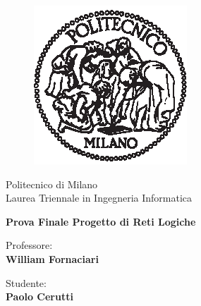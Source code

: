 \begin{titlepage}
\begin{figure}[!htb]
    \centering
    \includegraphics[keepaspectratio=true,scale=1.5]{images/Frontespizio/pol.eps}
\end{figure}

\begin{center}
    \huge{Politecnico di Milano}
    \vspace{10mm}
    \\ \Large{Laurea Triennale in Ingegneria Informatica}
\end{center}
\vspace{35mm}
\begin{center}
    {\LARGE{\bf Prova Finale Progetto di Reti Logiche }}
\end{center}
\vspace{70mm}

\begin{minipage}[t]{0.47\textwidth}
	{\large{Professore:}{\normalsize\vspace{3mm}
	\bf\\ \large{William Fornaciari}}}
\end{minipage}
\hfill
\begin{minipage}[t]{0.47\textwidth}\raggedleft
	{\large{Studente:}{\normalsize\vspace{3mm} \bf\\ \large{Paolo Cerutti}}}
\end{minipage}

\vspace{10mm}
\hrulefill
\\

\end{titlepage}